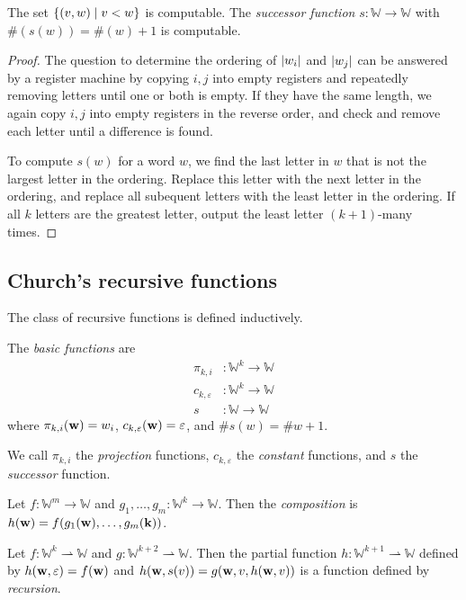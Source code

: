 \begin{theorem}
	The set \( \qty{(v,w) \mid v < w} \) is computable.
	The \emph{successor function} \( s \colon \mathbb W \to \mathbb W \) with \( \#(s(w)) = \#(w)+1 \) is computable.
\end{theorem}
\begin{proof}
	The question to determine the ordering of \( \abs{w_i} \) and \( \abs{w_j} \) can be answered by a register machine by copying \( i, j \) into empty registers and repeatedly removing letters until one or both is empty.
	If they have the same length, we again copy \( i, j \) into empty registers in the reverse order, and check and remove each letter until a difference is found.

	To compute \( s(w) \) for a word \( w \), we find the last letter in \( w \) that is not the largest letter in the ordering.
	Replace this letter with the next letter in the ordering, and replace all subequent letters with the least letter in the ordering.
	If all \( k \) letters are the greatest letter, output the least letter \( (k + 1) \)-many times.
\end{proof}

\subsection{Church's recursive functions}
The class of recursive functions is defined inductively.
\begin{definition}
	The \emph{basic functions} are
	\begin{align*}
		\pi_{k,i} &\colon \mathbb W^k \to \mathbb W \\
		c_{k,\varepsilon} &\colon \mathbb W^k \to \mathbb W \\
		s &\colon \mathbb W \to \mathbb W
	\end{align*}
	where \( \pi_{k,i}(\vb w) = w_i \), \( c_{k,\varepsilon}(\vb w) = \varepsilon \), and \( \# s(w) = \# w + 1 \).
\end{definition}
We call \( \pi_{k,i} \) the \emph{projection} functions, \( c_{k,\varepsilon} \) the \emph{constant} functions, and \( s \) the \emph{successor} function.

Let \( f \colon \mathbb W^m \to \mathbb W \) and \( g_1, \dots, g_m \colon \mathbb W^k \to \mathbb W \).
Then the \emph{composition} is \( h(\vb w) = f(g_1(\vb w), \dots, g_m(\vb k)) \).

Let \( f \colon \mathbb W^k \rightharpoonup \mathbb W \) and \( g \colon \mathbb W^{k+2} \rightharpoonup \mathbb W \).
Then the partial function \( h \colon \mathbb W^{k+1} \rightharpoonup \mathbb W \) defined by \( h(\vb w, \varepsilon) = f(\vb w) \) and \( h(\vb w, s(v)) = g(\vb w, v, h(\vb w, v)) \) is a function defined by \emph{recursion}.

